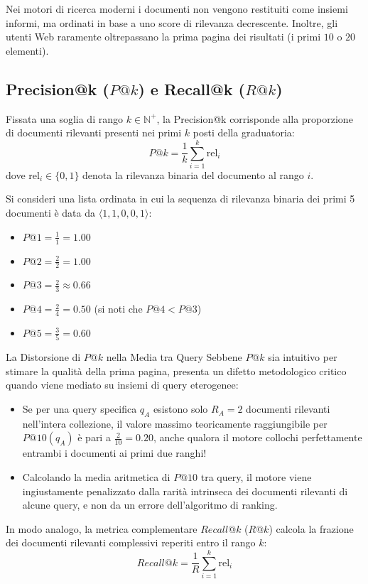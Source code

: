 Nei motori di ricerca moderni i documenti non vengono restituiti come insiemi informi, ma ordinati in base a uno score di rilevanza decrescente. Inoltre, gli utenti Web raramente oltrepassano la prima pagina dei risultati (i primi $10$ o $20$ elementi).

\subsection{\texorpdfstring{Precision@k ($P@k$) e Recall@k ($R@k$)}{Precision@k e Recall@k}}
\begin{definition}[Precision@k]
Fissata una soglia di rango $k \in \mathbb{N}^+$, la Precision@k corrisponde alla proporzione di documenti rilevanti presenti nei primi $k$ posti della graduatoria:
\begin{equation}
P@k = \frac{1}{k} \sum_{i=1}^k \mathrm{rel}_i
\end{equation}
dove $\mathrm{rel}_i \in \{0, 1\}$ denota la rilevanza binaria del documento al rango $i$.
\end{definition}

\begin{example}
Si consideri una lista ordinata in cui la sequenza di rilevanza binaria dei primi 5 documenti è data da $\langle 1, 1, 0, 0, 1 \rangle$:
\begin{itemize}
    \item $P@1 = \frac{1}{1} = 1.00$
    \item $P@2 = \frac{2}{2} = 1.00$
    \item $P@3 = \frac{2}{3} \approx 0.66$
    \item $P@4 = \frac{2}{4} = 0.50$ (si noti che $P@4 < P@3$)
    \item $P@5 = \frac{3}{5} = 0.60$
\end{itemize}
\end{example}

\begin{alertblock}{La Distorsione di $P@k$ nella Media tra Query}
Sebbene $P@k$ sia intuitivo per stimare la qualità della prima pagina, presenta un difetto metodologico critico quando viene mediato su insiemi di query eterogenee:
\begin{itemize}
    \item Se per una query specifica $q_A$ esistono solo $R_A = 2$ documenti rilevanti nell'intera collezione, il valore massimo teoricamente raggiungibile per $P@10(q_A)$ è pari a $\frac{2}{10} = 0.20$, anche qualora il motore collochi perfettamente entrambi i documenti ai primi due ranghi!
    \item Calcolando la media aritmetica di $P@10$ tra query, il motore viene ingiustamente penalizzato dalla rarità intrinseca dei documenti rilevanti di alcune query, e non da un errore dell'algoritmo di ranking.
\end{itemize}
In modo analogo, la metrica complementare $Recall@k$ ($R@k$) calcola la frazione dei documenti rilevanti complessivi reperiti entro il rango $k$:
\begin{equation}
Recall@k = \frac{1}{R} \sum_{i=1}^k \mathrm{rel}_i
\end{equation}
\end{alertblock}

